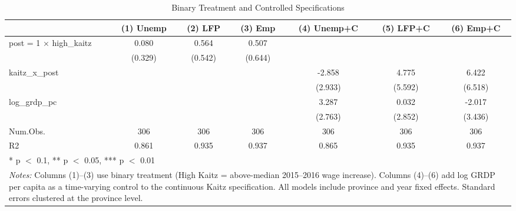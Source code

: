 \begin{table}
\centering
\caption{Binary Treatment and Controlled Specifications}
\label{tab:binary}
\centering\footnotesize
\begin{tabular}[t]{lcccccc}
\toprule
  & (1) Unemp & (2) LFP & (3) Emp & (4) Unemp+C & (5) LFP+C & (6) Emp+C\\
\midrule
post = 1 × high_kaitz & 0.080 & 0.564 & 0.507 &  &  & \\
 & (0.329) & (0.542) & (0.644) &  &  & \\
kaitz_x_post &  &  &  & -2.858 & 4.775 & 6.422\\
 &  &  &  & (2.933) & (5.592) & (6.518)\\
log_grdp_pc &  &  &  & 3.287 & 0.032 & -2.017\\
 &  &  &  & (2.763) & (2.852) & (3.436)\\
\midrule
Num.Obs. & 306 & 306 & 306 & 306 & 306 & 306\\
R2 & 0.861 & 0.935 & 0.937 & 0.865 & 0.935 & 0.937\\
\bottomrule
\multicolumn{7}{l}{\rule{0pt}{1em}* p $<$ 0.1, ** p $<$ 0.05, *** p $<$ 0.01}\\
\multicolumn{7}{p{0.95\textwidth}}{\rule{0pt}{1em}\textit{Notes:} Columns (1)--(3) use binary treatment (High Kaitz = above-median 2015--2016 wage increase). Columns (4)--(6) add log GRDP per capita as a time-varying control to the continuous Kaitz specification. All models include province and year fixed effects. Standard errors clustered at the province level.}\\
\end{tabular}
\end{table}
